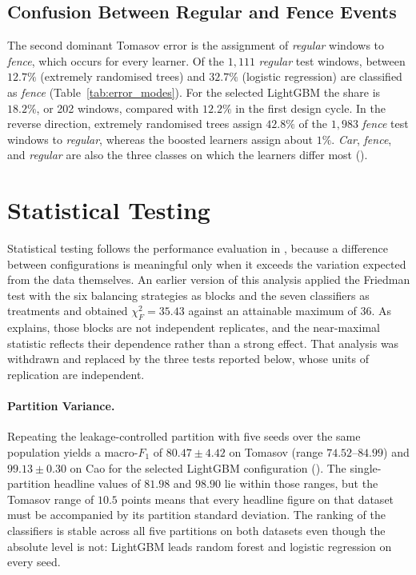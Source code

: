 \subsection{Confusion Between Regular and Fence Events}
\label{sec:resErrors}
The second dominant Tomasov error is the assignment of \emph{regular} windows to \emph{fence}, which occurs for every learner. Of the $1{,}111$ \emph{regular} test windows, between $12.7\%$ (extremely randomised trees) and $32.7\%$ (logistic regression) are classified as \emph{fence} (Table~\ref{tab:error_modes}). For the selected LightGBM the share is $18.2\%$, or 202 windows, compared with $12.2\%$ in the first design cycle. In the reverse direction, extremely randomised trees assign $42.8\%$ of the $1{,}983$ \emph{fence} test windows to \emph{regular}, whereas the boosted learners assign about $1\%$. \emph{Car}, \emph{fence}, and \emph{regular} are also the three classes on which the learners differ most ().

\section{Statistical Testing}
\label{sec:resStats}
Statistical testing follows the performance evaluation in , because a difference between configurations is meaningful only when it exceeds the variation expected from the data themselves. An earlier version of this analysis applied the Friedman test with the six balancing strategies as blocks and the seven classifiers as treatments and obtained $\chi^2_F = 35.43$ against an attainable maximum of $36$. As  explains, those blocks are not independent replicates, and the near-maximal statistic reflects their dependence rather than a strong effect. That analysis was withdrawn and replaced by the three tests reported below, whose units of replication are independent.

\paragraph[Partition Variance]{Partition Variance.}
Repeating the leakage-controlled partition with five seeds over the same population yields a macro-$F_1$ of $80.47 \pm 4.42$ on Tomasov (range $74.52$--$84.99$) and $99.13 \pm 0.30$ on Cao for the selected LightGBM configuration (). The single-partition headline values of $81.98$ and $98.90$ lie within those ranges, but the Tomasov range of $10.5$ points means that every headline figure on that dataset must be accompanied by its partition standard deviation. The ranking of the classifiers is stable across all five partitions on both datasets even though the absolute level is not: LightGBM leads random forest and logistic regression on every seed.

